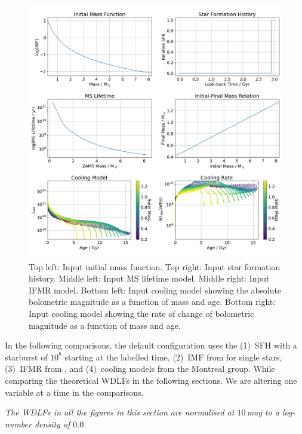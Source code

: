 \documentclass[fleqn,usenatbib]{rasti}
\begin{document}
\begin{figure}
    \centering
    \includegraphics[width=\textwidth]{fig_08_input_model.png}
    \caption{Top left: Input initial mass function. Top right: Input star
    formation history. Middle left: Input MS lifetime model. Middle right:
    Input IFMR model. Bottom left: Input cooling model showing the absolute
    bolometric magnitude as a function of mass and age. Bottom right: Input
    cooling model showing the rate of change of bolometric magnitude as a
    function of mass and age.}
    \label{fig:input_model}
\end{figure}

In the following comparisons, the default configuration uses the (1)~SFH with a
starburst of $10^8$ starting at the labelled time, (2)~IMF
from \citet{2003PASP..115..763C} for single stars, (3)~IFMR from
\citet{2008MNRAS.387.1693C}, and (4)~cooling models from the Montreal group.
While comparing the theoretical WDLFs in the following
sections. We are altering one variable at a time in the comparisons.

\textit{The WDLFs in all the figures in this section are
normalised at $10$\,mag to a log-number density of $0.0$.}
\end{document}
